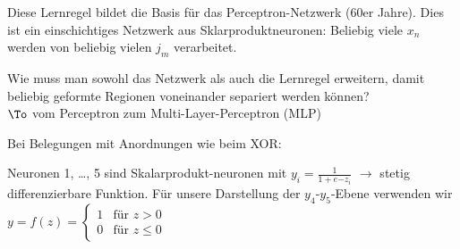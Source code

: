 Diese Lernregel bildet die Basis für das Perceptron-Netzwerk (60er Jahre). Dies ist ein einschichtiges Netzwerk aus Sklarproduktneuronen: Beliebig viele $x_n$ werden von beliebig vielen $j_m$ verarbeitet.

Wie muss man sowohl das Netzwerk als auch die Lernregel erweitern, damit beliebig geformte Regionen voneinander separiert werden können?\\
$\To$ vom Perceptron zum Multi-Layer-Perceptron (MLP)\bigskip

Bei Belegungen mit Anordnungen wie beim XOR:
\begin{center}
\end{center}
Neuronen 1, …, 5 sind Skalarprodukt-neuronen mit $y_i = \frac{1}{1+e{-z_i}}$ $\to$ stetig differenzierbare Funktion. Für unsere Darstellung der $y_4$-$y_5$-Ebene verwenden wir $y=f(z) = \begin{cases}
1 & \text{für } z> 0\\
0 & \text{für }z \leq 0
\end{cases}$

